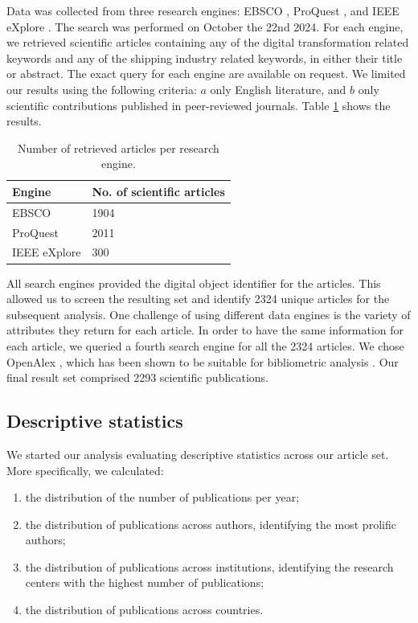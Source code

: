 \documentclass[a4paper, review, endfloat, authoryear]{elsarticle}
\begin{document}
	Data was collected from three research engines: EBSCO \citep{vaughan2011ebsco}, ProQuest \citep{cooke2017proquest}, and IEEE eXplore \citep{wilde2016ieee}. The search was performed on October the 22nd 2024. For each engine, we retrieved scientific articles containing any of the digital transformation related keywords and any of the shipping industry related keywords, in either their title or abstract. The exact query for each engine are available on request. We limited our results using the following criteria: \(a\) only English literature, and \(b\) only scientific contributions published in peer-reviewed journals. Table \ref{tab:searchres} shows the results.
	
	\begin{table}[h]
		\centering
		\caption{Number of retrieved articles per research engine.}
		\begin{tabularx}{\linewidth}{XX}
			\hline
			Engine & No. of scientific articles \\
			\hline
			EBSCO & 1904 \\
			ProQuest & 2011 \\
			IEEE eXplore & 300 \\
			\hline
		\end{tabularx}
		\label{tab:searchres}
	\end{table}
	
	All search engines provided the digital object identifier for the articles. This allowed us to screen the resulting set and identify 2324 unique articles for the subsequent analysis. One challenge of using different data engines is the variety of attributes they return for each article. In order to have the same information for each article, we queried a fourth search engine for all the 2324 articles. We chose OpenAlex \citep{priem2022openalex}, which has been shown to be suitable for bibliometric analysis \citep{alperin2024analysis}. Our final result set comprised 2293 scientific publications.
	
	\subsection{Descriptive statistics}
	We started our analysis evaluating descriptive statistics across our article set. More specifically, we calculated:
	\begin{enumerate}
		\item the distribution of the number of publications per year;
		\item the distribution of publications across authors, identifying the most prolific authors;
		\item the distribution of publications across institutions, identifying the research centers with the highest number of publications;
		\item the distribution of publications across countries.
	\end{enumerate}
	
\end{document}
